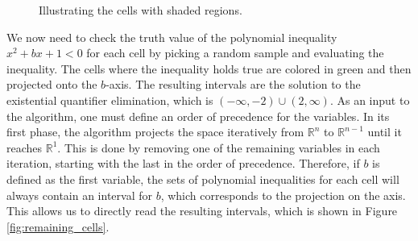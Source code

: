 \begin{figure}[h]
	\caption{Illustrating the cells with shaded regions.}
	\label{fig:example_cells}
\end{figure}
We now need to check the truth value of the polynomial inequality $x^2 + bx + 1 < 0$ for each cell by picking a random sample and evaluating the
inequality.
The cells where the inequality holds true are colored in green and then projected onto the $b$-axis.
The resulting intervals are the solution to the existential quantifier elimination, which is $(-\infty, -2) \cup (2, \infty)$.
As an input to the algorithm, one must define an order of precedence for the variables.
In its first phase, the algorithm projects the space iteratively from $\mathbb{R}^n$ to $\mathbb{R}^{n-1}$ until it reaches $\mathbb{R}^1$.
This is done by removing one of the remaining variables in each iteration, starting with the last in the order of precedence.
Therefore, if $b$ is defined as the first variable, the sets of polynomial inequalities for each cell will always contain an interval for $b$, which
corresponds to the projection on the axis.
This allows us to directly read the resulting intervals, which is shown in Figure \ref{fig:remaining_cells}.

